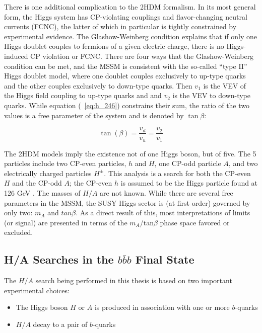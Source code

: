 There is one additional complication to the 2HDM formalism.  In its most general form, 
the Higgs system has CP-violating couplings and flavor-changing neutral currents 
(FCNC), the latter of which in particular is tightly constrained by experimental evidence.  
The Glashow-Weinberg condition explains that if only one Higgs doublet couples to fermions 
of a given electric charge, there is no Higgs-induced CP violation or 
FCNC.  There are four ways that the Glashow-Weinberg condition can be met, 
and the MSSM is consistent with the so-called ``type II'' Higgs 
doublet model, where one doublet couples exclusively to up-type quarks and the 
other couples exclusively to down-type quarks.  Then $v_1$ 
is the VEV of the Higgs field coupling to up-type quarks and and $v_2$ 
is the VEV to down-type quarks.  While equation (~\ref{eq:h_246}) 
constrains their sum, the ratio of the two values is a free parameter of 
the system and is denoted by $\tan\beta$:

\begin{equation}
	\tan(\beta) = \frac{v_d}{v_u} = \frac{v_2}{v_1}
\end{equation}




The 2HDM models imply the existence not of one Higgs boson, but of five.  
The 5 particles include two CP-even particles, $h$ and $H$, 
one CP-odd particle $A$, and two electrically charged particles $H^\pm$.   
This analysis is a search for both the CP-even $H$ and 
the CP-odd $A$; the CP-even $h$ is 
assumed to be the Higgs particle found at 126 GeV \cite{PDG-Review}.  
The masses of $H/A$ are not known.  While there are several free parameters in the MSSM, the SUSY Higgs sector is 
(at first order) governed by only two: $m_A$ 
and $tan\beta$.  As a direct result of this, most interpretations 
of limits (or signal) are presented in terms of the $m_A$/tan$\beta$ phase space favored or excluded.  




\subsection{H/A Searches in the $b\bar{b}b$ Final State}
The $H/A$ search being performed in this thesis is based on two important experimental choices:

\begin{itemize}
    \item The Higgs boson $H$ or $A$ is produced in association with one or more $b$-quarks
    \item $H/A$ decay to a pair of $b$-quarks
\end{itemize}


